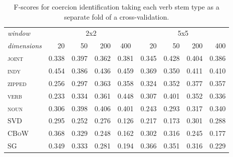 \begin{table}
\centering
\begin{tabular}{lrrrr|rrrr}
\hline
\emph{window} & \multicolumn{4}{c}{2x2} & \multicolumn{4}{c}{5x5} \\
\emph{dimensions} & 20 & 50 & 200 & \multicolumn{1}{c}{400} & 20 & 50 & 200 & 400 \\
\hline
\textsc{joint} & 0.338 & 0.397 & 0.362 & 0.381 & 0.345 & 0.428 & 0.404 & 0.386 \\
\textsc{indy} & 0.454 & 0.386 & 0.436 & 0.459 & 0.369 & 0.350 & 0.411 & 0.410 \\
\textsc{zipped} & 0.256 & 0.297 & 0.363 & 0.358 & 0.324 & 0.352 & 0.377 & 0.357 \\
\textsc{verb} & 0.233 & 0.334 & 0.361 & 0.448 & 0.307 & 0.401 & 0.352 & 0.336 \\
\textsc{noun} & 0.306 & 0.398 & 0.406 & 0.401 & 0.243 & 0.293 & 0.317 & 0.340 \\
\textsc{SVD} & 0.295 & 0.252 & 0.276 & 0.126 & 0.217 & 0.173 & 0.301 & 0.288 \\
\textsc{CBoW} & 0.368 & 0.329 & 0.248 & 0.162 & 0.302 & 0.316 & 0.245 & 0.177 \\
\textsc{SG} & 0.349 & 0.333 & 0.281 & 0.194 & 0.366 & 0.351 & 0.316 & 0.229 \\
\hline
\end{tabular}
\caption[F-Scores for Coercion Classification Testing on Unseen Verbs]{F-scores for coercion identification taking each verb stem type as a separate fold of a cross-validation.}
\label{tab:verb-coercion}
\end{table}

